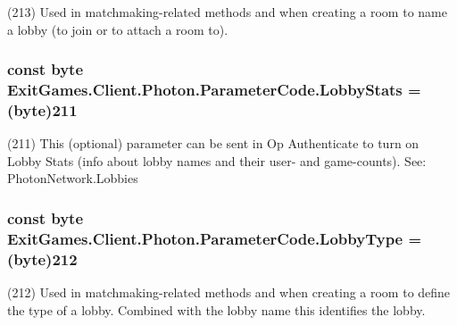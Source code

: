 (213) Used in matchmaking-\/related methods and when creating a room to name a lobby (to join or to attach a room to).

\subsubsection[{\texorpdfstring{Lobby\+Stats}{LobbyStats}}]{\setlength{\rightskip}{0pt plus 5cm}const byte Exit\+Games.\+Client.\+Photon.\+Parameter\+Code.\+Lobby\+Stats = (byte)211}\hypertarget{class_exit_games_1_1_client_1_1_photon_1_1_parameter_code_aabb8a502fb565bc4cbdfd48a23b4e7bc}{}\label{class_exit_games_1_1_client_1_1_photon_1_1_parameter_code_aabb8a502fb565bc4cbdfd48a23b4e7bc}


(211) This (optional) parameter can be sent in Op Authenticate to turn on Lobby Stats (info about lobby names and their user-\/ and game-\/counts). See\+: Photon\+Network.\+Lobbies

\subsubsection[{\texorpdfstring{Lobby\+Type}{LobbyType}}]{\setlength{\rightskip}{0pt plus 5cm}const byte Exit\+Games.\+Client.\+Photon.\+Parameter\+Code.\+Lobby\+Type = (byte)212}\hypertarget{class_exit_games_1_1_client_1_1_photon_1_1_parameter_code_a195d283fab30f59f8f0d3b9646ab3af4}{}\label{class_exit_games_1_1_client_1_1_photon_1_1_parameter_code_a195d283fab30f59f8f0d3b9646ab3af4}


(212) Used in matchmaking-\/related methods and when creating a room to define the type of a lobby. Combined with the lobby name this identifies the lobby.

